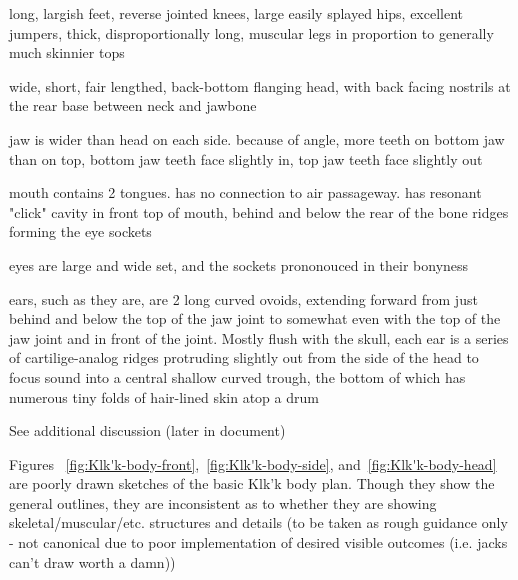 long, largish feet, reverse jointed knees, large easily splayed hips,
excellent jumpers, thick, disproportionally long, muscular legs in
proportion to generally much skinnier tops

wide, short, fair lengthed, back-bottom flanging head, with back
facing nostrils at the rear base between neck and jawbone

jaw is wider than head on each side. because of angle, more teeth on
bottom jaw than on top, bottom jaw teeth face slightly in, top jaw
teeth face slightly out

mouth contains 2 tongues. has no connection to air passageway. has
resonant "click" cavity in front top of mouth, behind and below the
rear of the bone ridges forming the eye sockets

eyes are large and wide set, and the sockets prononouced in their
bonyness

ears, such as they are, are 2 long curved ovoids, extending forward
from just behind and below the top of the jaw joint to somewhat even
with the top of the jaw joint and in front of the joint.  Mostly flush
with the skull, each ear is a series of cartilige-analog ridges
protruding slightly out from the side of the head to focus sound into
a central shallow curved trough, the bottom of which has numerous tiny
folds of hair-lined skin atop a drum

See additional discussion (later in document)

Figures ~\ref{fig:Klk'k-body-front},~\ref{fig:Klk'k-body-side}, and~\ref{fig:Klk'k-body-head} are poorly drawn sketches of the basic Klk'k body plan. Though
they show the general outlines, they are inconsistent as to whether
they are showing skeletal/muscular/etc. structures and details (to be
taken as rough guidance only - not canonical due to poor
implementation of desired visible outcomes (i.e. jacks can't draw
worth a damn))

